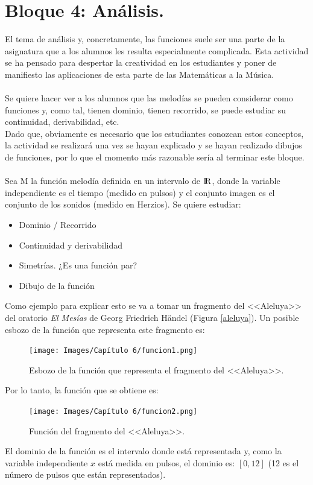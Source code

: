 \documentclass[a4paper, openright, 11pt, titlepage]{report}
\theoremstyle{definition}\newtheorem{defin}[propo]{Definition}
\theoremstyle{definition}\newtheorem{obser}[propo]{Remark}
\theoremstyle{definition}\newtheorem{ejem}[propo]{Ejemplo}
\theoremstyle{definition}\newtheorem{algoritmo}[propo]{Algoritmo}
\begin{document}
\section{Bloque 4: Análisis.}
El tema de análisis y, concretamente, las funciones suele ser una parte de la asignatura que a los alumnos les resulta especialmente complicada. Esta actividad se ha pensado para despertar la creatividad en los estudiantes y poner de manifiesto las aplicaciones de esta parte de las Matemáticas a la Música.\\\\
Se quiere hacer ver a los alumnos que las melodías se pueden considerar como funciones y, como tal, tienen dominio, tienen recorrido, se puede estudiar su continuidad, derivabilidad, etc. \\
Dado que, obviamente es necesario que los estudiantes conozcan estos conceptos, la actividad se realizará una vez se hayan explicado y se hayan realizado dibujos de funciones, por lo que el momento más razonable sería al terminar este bloque.\\\\
Sea M la función melodía definida en un intervalo de ${\rm I\!R}$, donde la variable independiente es el tiempo (medido en pulsos) y el conjunto imagen es el conjunto de los sonidos (medido en Herzios). Se quiere estudiar:
\begin{itemize}
    \item Dominio / Recorrido
    \item Continuidad y derivabilidad
    \item Simetrías. ¿Es una función par?
    \item Dibujo de la función
\end{itemize}
Como ejemplo para explicar esto se va a tomar un fragmento del <<Aleluya>> del oratorio \textit{El Mesías} de Georg Friedrich Händel (Figura \ref{aleluya}). Un posible esbozo de la función que representa este fragmento es:
\begin{figure}[H]
    \centering
    \texttt{[image: Images/Capítulo 6/funcion1.png]}
    \caption{Esbozo de la función que representa el fragmento del <<Aleluya>>.}
\end{figure}
Por lo tanto, la función que se obtiene es:
\begin{figure}[H]
    \centering
    \texttt{[image: Images/Capítulo 6/funcion2.png]}
    \caption{Función del fragmento del <<Aleluya>>.}
    \label{funcion}
\end{figure}
El dominio de la función es el intervalo donde está representada y, como la variable independiente $x$ está medida en pulsos, el dominio es: $[0, 12]$ (12 es el número de pulsos que están representados).\\
\end{document}
